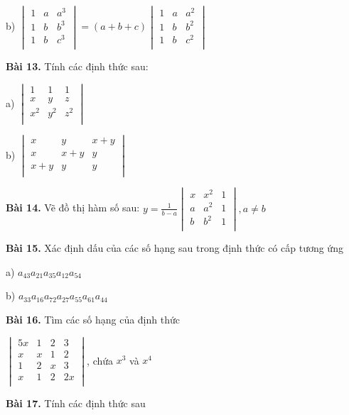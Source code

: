 \documentclass[12pt]{report}
\begin{document}
b) $\begin{vmatrix}
	1 & a & a^3 \\
	1 & b & b^3 \\
	1 & b & c^3 \\
\end{vmatrix} = (a+b+c) \begin{vmatrix}
	1 & a & a^2 \\
	1 & b & b^2 \\
	1 & b & c^2 \\
\end{vmatrix}$

\textbf{Bài 13.} Tính các định thức sau:

a) $\begin{vmatrix}
	1 & 1 & 1 \\ 
	x & y & z \\
	x^2 & y^2 & z^2 \\
\end{vmatrix}$

b) $\begin{vmatrix}
	x & y & x+y \\ 
	x & x+y & y \\
	x+y & y & y \\
\end{vmatrix}$

\textbf{Bài 14.} Vẽ đồ thị hàm số sau: $y = \frac{1}{b-a}\begin{vmatrix}
	x & x^2 & 1 \\ 
	a & a^2 & 1 \\
	b & b^2 & 1 \\
\end{vmatrix}, a \neq b$

\textbf{Bài 15.} Xác định dấu của các số hạng sau trong định thức có cấp tương ứng 

a) $a_{43}a_{21}a_{35}a_{12}a_{54}$

b) $a_{33}a_{16}a_{72}a_{27}a_{55}a_{61}a_{44}$

\textbf{Bài 16.} Tìm các số hạng của định thức

$\begin{vmatrix}
	5x & 1 & 2 & 3 \\
	x & x & 1 & 2 \\
	1 & 2 & x & 3 \\
	x & 1 & 2 & 2x \\
\end{vmatrix}$, chứa $x^3$ và $x^4$

\textbf{Bài 17.} Tính các định thức sau
\end{document}

